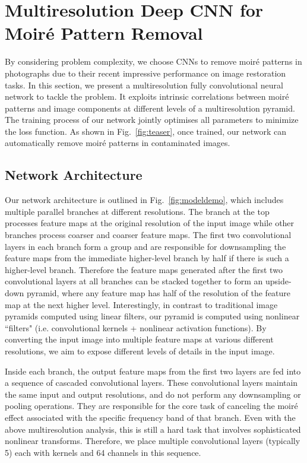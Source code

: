\documentclass[journal]{IEEEtran}
\begin{document}
\section{Multiresolution Deep CNN for Moir\'{e} Pattern Removal}
By considering problem complexity, we choose CNNs to remove moir\'{e} patterns in photographs due to their recent impressive performance on image restoration tasks.  
In this section, we present a multiresolution fully convolutional neural network to tackle the problem. It exploits intrinsic correlations between moir\'{e} patterns and image components at different levels of a multiresolution pyramid. The training process of our network jointly optimises all parameters to minimize the loss function. As shown in Fig.~\ref{fig:teaser}, once trained, our network can automatically remove moir\'{e} patterns in contaminated images.


\subsection{Network Architecture}
Our network architecture is outlined in Fig.~\ref{fig:modeldemo}, which includes multiple parallel branches at different resolutions. The branch at the top processes feature maps at the original resolution of the input image while other branches process coarser and coarser feature maps. The first two convolutional layers in each branch form a group and are responsible for downsampling the feature maps from the immediate higher-level branch by half if there is such a higher-level branch. Therefore the feature maps generated after the first two convolutional layers at all branches can be stacked together to form an upside-down pyramid, where any feature map has half of the resolution of the feature map at the next higher level. Interestingly, in contrast to traditional image pyramids computed using linear filters, our pyramid is computed using nonlinear ``filters" (i.e. convolutional kernels + nonlinear activation functions). By converting the input image into multiple feature maps at various different resolutions, we aim to expose different levels of details in the input image.

Inside each branch, the output feature maps from the first two layers are fed into a sequence of cascaded convolutional layers. These convolutional layers maintain the same input and output resolutions, and do not perform any downsampling or pooling operations. They are responsible for the core task of canceling the moir\'{e} effect associated with the specific frequency band of that branch. Even with the above multiresolution analysis, this is still a hard task that involves sophisticated nonlinear transforms. Therefore, we place multiple convolutional layers (typically 5) each with  kernels and 64 channels in this sequence.
\end{document}
